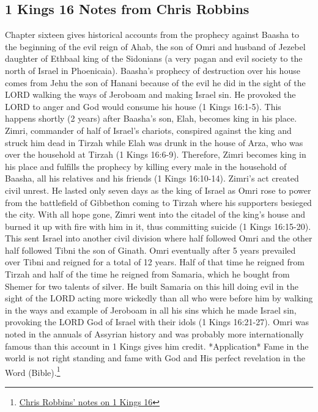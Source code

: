 \subsection{1 Kings 16 Notes from Chris Robbins}
Chapter sixteen gives historical accounts from the prophecy against Baasha to the beginning of the evil reign of Ahab, the son of Omri and husband of Jezebel daughter of Ethbaal king of the Sidonians (a very pagan and evil society to the north of Israel in Phoenicaia). Baasha’s prophecy of destruction over his house comes from Jehu the son of Hanani because of the evil he did in the sight of the LORD walking the ways of Jeroboam and making Israel sin. He provoked the LORD to anger and God would consume his house (1 Kings 16:1-5). This happens shortly (2 years) after Baasha’s son, Elah, becomes king in his place. Zimri, commander of half of Israel’s chariots, conspired against the king and struck him dead in Tirzah while Elah was drunk in the house of Arza, who was over the household at Tirzah (1 Kings 16:6-9). Therefore, Zimri becomes king in his place and fulfills the prophecy by killing every male in the household of Baasha, all his relatives and his friends (1 Kings 16:10-14). Zimri’s act created civil unrest. He lasted only seven days as the king of Israel as Omri rose to power from the battlefield of Gibbethon coming to Tirzah where his supporters besieged the city. With all hope gone, Zimri went into the citadel of the king’s house and burned it up with fire with him in it, thus committing suicide (1 Kings 16:15-20). This sent Israel into another civil division where half followed Omri and the other half followed Tibni the son of Ginath. Omri eventually after 5 years prevailed over Tibni and reigned for a total of 12 years. Half of that time he reigned from Tirzah and half of the time he reigned from Samaria, which he bought from Shemer for two talents of silver. He built Samaria on this hill doing evil in the sight of the LORD acting more wickedly than all who were before him by walking in the ways and example of Jeroboam in all his sins which he made Israel sin, provoking the LORD God of Israel with their idols (1 Kings 16:21-27). Omri was noted in the annuals of Assyrian history and was probably more internationally famous than this account in 1 Kings gives him credit. *Application* Fame in the world is not right standing and fame with God and His perfect revelation in the Word (Bible).\footnote{\href{http://pastorchrisrobbins.blogspot.com/2013/06/1-kings-bible-study-notes-chapter-16.html}{Chris Robbins' notes on 1 Kings 16} }\\
